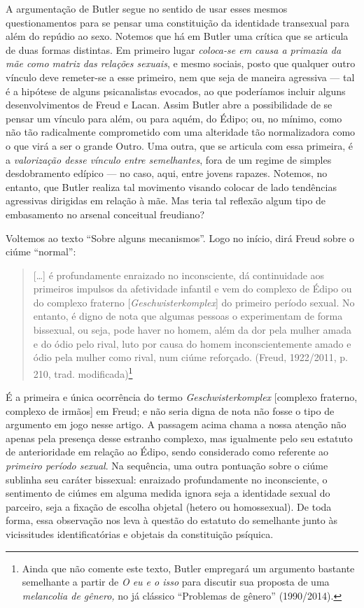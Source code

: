 A argumentação de Butler segue no sentido de usar esses mesmos
questionamentos para se pensar uma constituição da identidade transexual
para além do repúdio ao sexo. Notemos que há em Butler uma crítica que
se articula de duas formas distintas. Em primeiro lugar \emph{coloca-se
em causa a primazia da mãe como matriz das relações sexuais}, e mesmo
sociais, posto que qualquer outro vínculo deve remeter-se a esse
primeiro, nem que seja de maneira agressiva --- tal é a hipótese de
alguns psicanalistas evocados, ao que poderíamos incluir alguns
desenvolvimentos de Freud e Lacan. Assim Butler abre a possibilidade de
se pensar um vínculo para além, ou para aquém, do Édipo; ou, no mínimo,
como não tão radicalmente comprometido com uma alteridade tão
normalizadora como o que virá a ser o grande Outro. Uma outra, que se
articula com essa primeira, é a \emph{valorização desse vínculo entre
semelhantes}, fora de um regime de simples desdobramento edípico --- no
caso, aqui, entre jovens rapazes. Notemos, no entanto, que Butler
realiza tal movimento visando colocar de lado tendências agressivas
dirigidas em relação à mãe. Mas teria tal reflexão algum tipo de
embasamento no arsenal conceitual freudiano?

Voltemos ao texto ``Sobre alguns mecanismos''. Logo no início,
dirá Freud sobre o ciúme ``normal'':

\begin{quote}
{[}\ldots{}{]} é profundamente enraizado no inconsciente, dá continuidade aos
primeiros impulsos da afetividade infantil e vem do complexo de Édipo ou
do complexo fraterno {[}\emph{Geschwisterkomplex}{]} do primeiro período
sexual. No entanto, é digno de nota que algumas pessoas o experimentam
de forma bissexual, ou seja, pode haver no homem, além da dor pela
mulher amada e do ódio pelo rival, luto por causa do homem
inconscientemente amado e ódio pela mulher como rival, num ciúme
reforçado. (Freud, 1922/2011, p. 210, trad. modificada)\footnote{Ainda
  que não comente este texto, Butler empregará um argumento bastante
  semelhante a partir de \emph{O eu e o isso} para discutir sua proposta
  de uma \emph{melancolia de gênero,} no já clássico ``Problemas de
  gênero'' (1990/2014).}
\end{quote}

É a primeira e única ocorrência do termo \emph{Geschwisterkomplex}
{[}complexo fraterno, complexo de irmãos{]} em Freud; e não seria digna
de nota não fosse o tipo de argumento em jogo nesse artigo. A passagem
acima chama a nossa atenção não apenas pela presença desse estranho
complexo, mas igualmente pelo seu estatuto de anterioridade em relação
ao Édipo, sendo considerado como referente ao \emph{primeiro período
sexual}. Na sequência, uma outra pontuação sobre o ciúme sublinha seu
caráter bissexual: enraizado profundamente no inconsciente, o sentimento
de ciúmes em alguma medida ignora seja a identidade sexual do parceiro,
seja a fixação de escolha objetal (hetero ou homossexual). De toda
forma, essa observação nos leva à questão do estatuto do semelhante
junto às vicissitudes identificatórias e objetais da constituição
psíquica.

